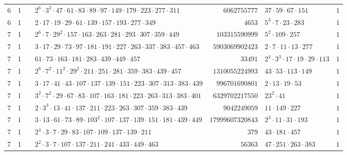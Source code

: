 \documentclass[a4paper,twoside,10pt]{report}
\renewcommand{\checkmark}{\text{\ding{51}}}
\newcommand{\cross}{\text{\ding{55}}}
\begin{document}
\begin{longtable}{rrcp{5cm}rp{5cm}r}
6 & 1 & \checkmark& $2^{6} \cdot 3^{2} \cdot 47 \cdot 61 \cdot 83 \cdot 89 \cdot 97 \cdot 149 \cdot 179 \cdot 223 \cdot 277 \cdot 311$ & $6062755777$ & $37 \cdot 59 \cdot 67 \cdot 151$ & $1$\\
6 & 1 & \cross& $2 \cdot 17 \cdot 19 \cdot 29 \cdot 61 \cdot 139 \cdot 157 \cdot 193 \cdot 277 \cdot 349$ & $4653$ & $5^{3} \cdot 7 \cdot 23 \cdot 283$ & $1$\\
7 & 1 & \checkmark& $2^{6} \cdot 7 \cdot 29^{2} \cdot 157 \cdot 163 \cdot 263 \cdot 281 \cdot 293 \cdot 307 \cdot 359 \cdot 449$ & $103315590999$ & $5^{2} \cdot 109 \cdot 257$ & $1$\\
7 & 1 & \checkmark& $3 \cdot 17 \cdot 29 \cdot 73 \cdot 97 \cdot 181 \cdot 191 \cdot 227 \cdot 263 \cdot 337 \cdot 383 \cdot 457 \cdot 463$ & $5903069902423$ & $2 \cdot 7 \cdot 11 \cdot 13 \cdot 277$ & $1$\\
7 & 1 & \cross& $61 \cdot 73 \cdot 163 \cdot 181 \cdot 283 \cdot 439 \cdot 449 \cdot 457$ & $33491$ & $2^{4} \cdot 3^{3} \cdot 17 \cdot 19 \cdot 29 \cdot 113$ & $1$\\
7 & 1 & \checkmark& $2^{6} \cdot 7^{2} \cdot 11^{2} \cdot 29^{2} \cdot 211 \cdot 251 \cdot 281 \cdot 359 \cdot 383 \cdot 439 \cdot 457$ & $1310055224993$ & $43 \cdot 53 \cdot 113 \cdot 149$ & $1$\\
7 & 1 & \checkmark& $3 \cdot 17 \cdot 41 \cdot 43 \cdot 107 \cdot 137 \cdot 139 \cdot 151 \cdot 223 \cdot 307 \cdot 313 \cdot 383 \cdot 439$ & $996701690801$ & $2 \cdot 13 \cdot 19 \cdot 53$ & $1$\\
7 & 1 & \checkmark& $3^{2} \cdot 7^{2} \cdot 29 \cdot 67 \cdot 83 \cdot 107 \cdot 163 \cdot 181 \cdot 223 \cdot 263 \cdot 313 \cdot 383 \cdot 401$ & $6329702217550$ & $23^{2} \cdot 41$ & $1$\\
7 & 1 & \checkmark& $2 \cdot 3^{3} \cdot 13 \cdot 41 \cdot 137 \cdot 211 \cdot 223 \cdot 263 \cdot 307 \cdot 359 \cdot 383 \cdot 439$ & $9042249059$ & $11 \cdot 149 \cdot 227$ & $1$\\
7 & 1 & \checkmark& $3 \cdot 13 \cdot 61 \cdot 73 \cdot 89 \cdot 103^{2} \cdot 107 \cdot 137 \cdot 139 \cdot 151 \cdot 181 \cdot 439 \cdot 449$ & $17999607320843$ & $2^{3} \cdot 11 \cdot 31 \cdot 193$ & $1$\\
7 & 1 & \cross& $2^{4} \cdot 3 \cdot 7 \cdot 29 \cdot 83 \cdot 107 \cdot 109 \cdot 137 \cdot 139 \cdot 211$ & $379$ & $43 \cdot 181 \cdot 457$ & $1$\\
7 & 1 & \cross& $2^{2} \cdot 3 \cdot 7 \cdot 107 \cdot 137 \cdot 211 \cdot 241 \cdot 433 \cdot 449 \cdot 463$ & $56363$ & $47 \cdot 251 \cdot 263 \cdot 383$ & $1$\\

\end{longtable}
\end{document}

